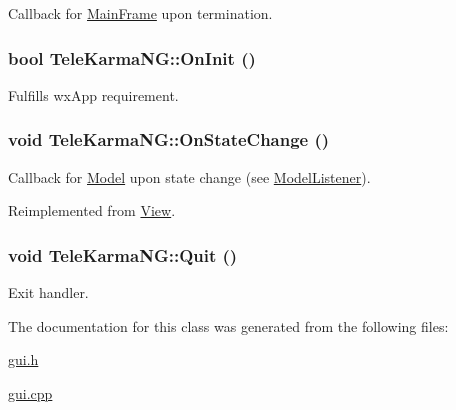 Callback for \hyperlink{classMainFrame}{MainFrame} upon termination. 

\hypertarget{classTeleKarmaNG_87ccb2d5650091ba595c4b7bd832d752}{
\subsubsection[{OnInit}]{\setlength{\rightskip}{0pt plus 5cm}bool TeleKarmaNG::OnInit ()}}
\label{classTeleKarmaNG_87ccb2d5650091ba595c4b7bd832d752}


Fulfills wxApp requirement. 

\hypertarget{classTeleKarmaNG_ce1e8d62f3e1d586e2aa5d2012c9a766}{
\subsubsection[{OnStateChange}]{\setlength{\rightskip}{0pt plus 5cm}void TeleKarmaNG::OnStateChange ()}}
\label{classTeleKarmaNG_ce1e8d62f3e1d586e2aa5d2012c9a766}


Callback for \hyperlink{classModel}{Model} upon state change (see \hyperlink{classModelListener}{ModelListener}). 



Reimplemented from \hyperlink{classView_92a0d9fd64b52e7f85d45c46c28a6546}{View}.\hypertarget{classTeleKarmaNG_cf965461b8261feb570acbaa88e4452d}{
\subsubsection[{Quit}]{\setlength{\rightskip}{0pt plus 5cm}void TeleKarmaNG::Quit ()}}
\label{classTeleKarmaNG_cf965461b8261feb570acbaa88e4452d}


Exit handler. 



The documentation for this class was generated from the following files:\begin{CompactItemize}
\item 
\hyperlink{gui_8h}{gui.h}\item 
\hyperlink{gui_8cpp}{gui.cpp}\end{CompactItemize}
